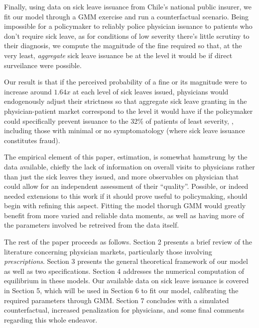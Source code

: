 \documentclass[../main.tex]{subfiles}
\begin{document}
Finally, using data on sick leave issuance from Chile's national public insurer, we fit our model through a GMM exercise and run a counterfactual scenario. Being impossible for a policymaker to reliably police physician issuance to patients who don't require sick leave, as for conditions of low severity there's little scrutiny to their diagnosis, we compute the magnitude of the fine required so that, at the very least, \textit{aggregate} sick leave issuance be at the level it would be if direct surveilance were possible.

Our result is that if the perceived probability of a fine or its magnitude were to increase around $1.64x$ at each level of sick leaves issued, physicians would endogenously adjust their strictness so that aggregate sick leave granting in the physician-patient market correspond to the level it would have if the policymaker could specifically prevent issuance to the 32\% of patients of least severity, , including those with minimal or no symptomatology (where sick leave issuance constitutes fraud).

The empirical element of this paper, estimation, is somewhat hamstrung by the data available, chiefly the lack of information on overall visits to physicians rather than just the sick leaves they issued, and more observables on physician that could allow for an independent assessment of their ``quality''. Possible, or indeed needed extensions to this work if it should prove useful to policymaking, should begin with refining this aspect. Fitting the model thorugh GMM would greatly benefit from more varied and reliable data moments, as well as having more of the parameters involved be retreived from the data itself.

The rest of the paper proceeds as follows. Section 2 presents a brief review of the literature concerning physician markets, particularly those involving \textit{prescriptions}. Section 3 presents the general theoretical framework of our model as well as two specifications. Section 4 addresses the numerical computation of equilibrium in these models. Our available data on sick leave issuance is covered in Section 5, which will be used in Section 6 to fit our model, calibrating the required parameters through GMM. Section 7 concludes with a simulated counterfactual, increased penalization for physicians, and some final comments regarding this whole endeavor.
\end{document}
